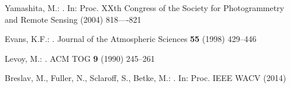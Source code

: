 \documentclass[runningheads]{llncs}
\begin{document}
\begin{thebibliography}{10}
Yamashita, M.:
.
\newblock In: Proc. XXth Congress of the Society for Photogrammetry and Remote
  Sensing  (2004)  818----821

Evans, K.F.:
.
\newblock Journal of the Atmospheric Sciences \textbf{55} (1998)  429--446

Levoy, M.:
.
\newblock ACM TOG \textbf{9} (1990)  245--261

Breslav, M., Fuller, N., Sclaroff, S., Betke, M.:
.
\newblock In: Proc. IEEE WACV  (2014)

\end{thebibliography}




\end{document}

